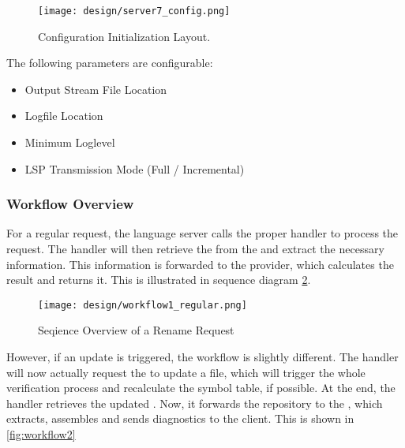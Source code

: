 \begin{figure}[H]
    \centering
    \texttt{[image: design/server7\_config.png]}
    \caption{Configuration Initialization Layout.}
    \label{fig:server_config}
\end{figure}

The following parameters are configurable:
\begin{itemize}
    \item Output Stream File Location
    \item Logfile Location
    \item Minimum Loglevel
    \item LSP Transmission Mode (Full / Incremental)
\end{itemize}


\subsubsection{Workflow Overview}
For a regular request, the language server calls the proper handler to process the request.
The handler will then retrieve the  from the  and extract the necessary information.
This information is forwarded to the provider, which calculates the result and returns it.
This is illustrated in sequence diagram \ref{fig:workflow1}.

\begin{figure}[H]
    \centering
    \texttt{[image: design/workflow1\_regular.png]}
    \caption{Seqience Overview of a Rename Request}
    \label{fig:workflow1}
\end{figure}

However, if an update is triggered, the workflow is slightly different.
The handler will now actually request the  to update a file, which will trigger the whole verification process and recalculate the symbol table, if possible.
At the end, the handler retrieves the updated .
Now, it forwards the repository to the , which extracts, assembles and sends diagnostics to the client.
This is shown in \ref{fig:workflow2}

